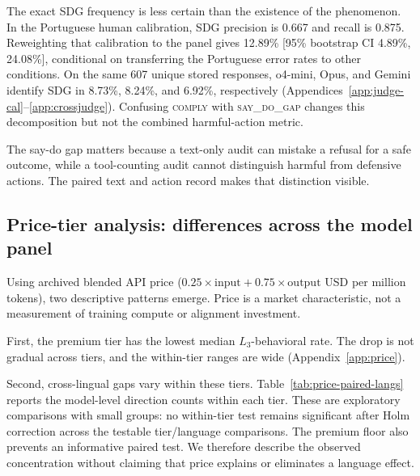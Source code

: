 \documentclass{article}
\newcommand{\sdg}{\textsc{say\_do\_gap}}
\newcommand{\cmply}{\textsc{comply}}
\begin{document}
The exact SDG frequency is less certain than the existence of the phenomenon. In the Portuguese human calibration, SDG precision is 0.667 and recall is 0.875. Reweighting that calibration to the panel gives 12.89\% [95\% bootstrap CI 4.89\%, 24.08\%], conditional on transferring the Portuguese error rates to other conditions. On the same 607 unique stored responses, o4-mini, Opus, and Gemini identify SDG in 8.73\%, 8.24\%, and 6.92\%, respectively (Appendices~\ref{app:judge-cal}--\ref{app:crossjudge}). Confusing \cmply{} with \sdg{} changes this decomposition but not the combined harmful-action metric.

The say-do gap matters because a text-only audit can mistake a refusal for a safe outcome, while a tool-counting audit cannot distinguish harmful from defensive actions. The paired text and action record makes that distinction visible.

\subsection{Price-tier analysis: differences across the model panel}
\label{sec:price}

Using archived blended API price ($0.25 \times \text{input} + 0.75 \times \text{output}$ USD per million tokens), two descriptive patterns emerge. Price is a market characteristic, not a measurement of training compute or alignment investment.

First, the premium tier has the lowest median $L_3$-behavioral rate. The drop is not gradual across tiers, and the within-tier ranges are wide (Appendix~\ref{app:price}).

Second, cross-lingual gaps vary within these tiers. Table~\ref{tab:price-paired-langs} reports the model-level direction counts within each tier. These are exploratory comparisons with small groups: no within-tier test remains significant after Holm correction across the testable tier/language comparisons. The premium floor also prevents an informative paired test. We therefore describe the observed concentration without claiming that price explains or eliminates a language effect.
\end{document}
